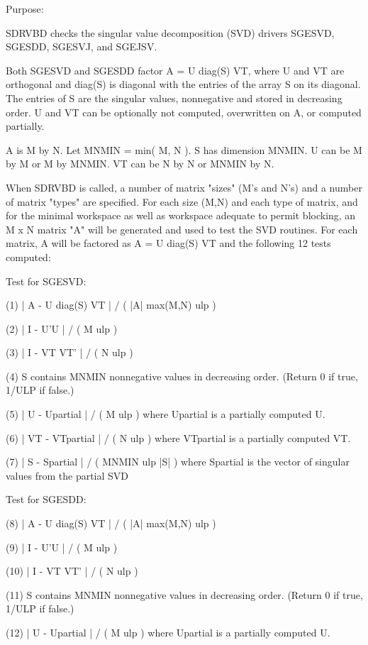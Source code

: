 \begin{DoxyParagraph}{Purpose\+: }
\begin{DoxyVerb} SDRVBD checks the singular value decomposition (SVD) drivers
 SGESVD, SGESDD, SGESVJ, and SGEJSV.

 Both SGESVD and SGESDD factor A = U diag(S) VT, where U and VT are
 orthogonal and diag(S) is diagonal with the entries of the array S
 on its diagonal. The entries of S are the singular values,
 nonnegative and stored in decreasing order.  U and VT can be
 optionally not computed, overwritten on A, or computed partially.

 A is M by N. Let MNMIN = min( M, N ). S has dimension MNMIN.
 U can be M by M or M by MNMIN. VT can be N by N or MNMIN by N.

 When SDRVBD is called, a number of matrix "sizes" (M's and N's)
 and a number of matrix "types" are specified.  For each size (M,N)
 and each type of matrix, and for the minimal workspace as well as
 workspace adequate to permit blocking, an  M x N  matrix "A" will be
 generated and used to test the SVD routines.  For each matrix, A will
 be factored as A = U diag(S) VT and the following 12 tests computed:

 Test for SGESVD:

 (1)    | A - U diag(S) VT | / ( |A| max(M,N) ulp )

 (2)    | I - U'U | / ( M ulp )

 (3)    | I - VT VT' | / ( N ulp )

 (4)    S contains MNMIN nonnegative values in decreasing order.
        (Return 0 if true, 1/ULP if false.)

 (5)    | U - Upartial | / ( M ulp ) where Upartial is a partially
        computed U.

 (6)    | VT - VTpartial | / ( N ulp ) where VTpartial is a partially
        computed VT.

 (7)    | S - Spartial | / ( MNMIN ulp |S| ) where Spartial is the
        vector of singular values from the partial SVD

 Test for SGESDD:

 (8)    | A - U diag(S) VT | / ( |A| max(M,N) ulp )

 (9)    | I - U'U | / ( M ulp )

 (10)   | I - VT VT' | / ( N ulp )

 (11)   S contains MNMIN nonnegative values in decreasing order.
        (Return 0 if true, 1/ULP if false.)

 (12)   | U - Upartial | / ( M ulp ) where Upartial is a partially
        computed U.


\end{DoxyVerb}
\end{DoxyParagraph}
